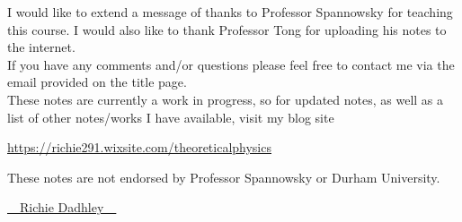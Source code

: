 \documentclass[11pt,oneside]{book}
\theoremstyle{definition} %
\theoremstyle{plain} %
\theoremstyle{remark} %
\theoremstyle{underline}
\begin{document}
I would like to extend a message of thanks to Professor Spannowsky for teaching this course. I would also like to thank Professor Tong for uploading his notes to the internet. \\

If you have any comments and/or questions please feel free to contact me via the email provided on the title page. \\

These notes are currently a work in progress, so for updated notes, as well as a list of other notes/works I have available, visit my blog site

\begin{center}
    \href{https://richie291.wixsite.com/theoreticalphysics}{https://richie291.wixsite.com/theoreticalphysics}
\end{center}

These notes are not endorsed by Professor Spannowsky or Durham University.

\vspace{1cm}

\begin{flushright}
    \Huge{{\cursive\setul{0.1ex}{}\ul{~~Richie Dadhley~~}}}
\end{flushright}


\tableofcontents


\mainmatter















% 
% 



%
\end{document}
